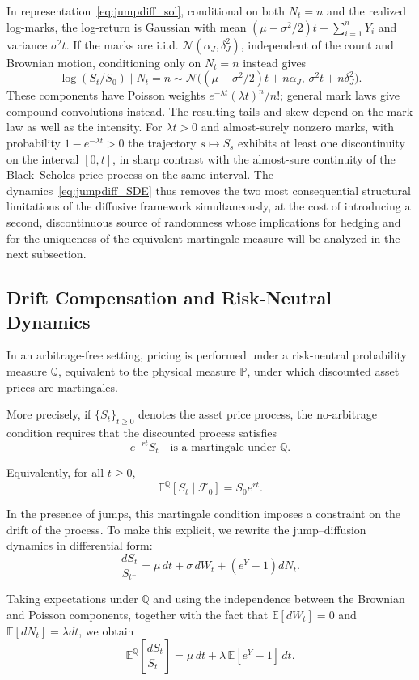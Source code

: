 In representation~\eqref{eq:jumpdiff_sol}, conditional on both
$N_t=n$ and the realized log-marks, the log-return is Gaussian with
mean $(\mu-\sigma^2/2)t+\sum_{i=1}^nY_i$ and variance $\sigma^2t$.
If the marks are i.i.d. $\mathcal N(\alpha_J,\delta_J^2)$, independent of the
count and Brownian motion, conditioning only on $N_t=n$ instead gives
\[
\log(S_t/S_0)\mid N_t=n\sim
\mathcal N\bigl((\mu-\sigma^2/2)t+n\alpha_J,\,\sigma^2t+n\delta_J^2\bigr).
\]
These components have Poisson weights $e^{-\lambda t}(\lambda t)^n/n!$;
general mark laws give compound convolutions instead. The resulting
tails and skew depend on the mark law as well as the intensity.
For $\lambda t>0$ and almost-surely nonzero marks, with probability
$1 - e^{-\lambda t} > 0$ the trajectory $s \mapsto S_s$ exhibits at
least one discontinuity on the interval $[0,t]$, in sharp contrast
with the almost-sure continuity of the Black--Scholes price process
on the same interval. The dynamics~\eqref{eq:jumpdiff_SDE} thus
removes the two most consequential structural limitations of the
diffusive framework simultaneously, at the cost of introducing a
second, discontinuous source of randomness whose implications for
hedging and for the uniqueness of the equivalent martingale measure
will be analyzed in the next subsection.
\subsection{Drift Compensation and Risk-Neutral Dynamics}
\label{sec:jd-risk-neutral}

In an arbitrage-free setting, pricing is performed under a risk-neutral probability measure $\mathbb{Q}$, equivalent to the physical measure $\mathbb{P}$, under which discounted asset prices are martingales.

More precisely, if $\{S_t\}_{t \geq 0}$ denotes the asset price process, the no-arbitrage condition requires that the discounted process satisfies
\[
e^{-rt} S_t \quad \text{is a martingale under } \mathbb{Q}.
\]

Equivalently, for all $t \geq 0$,
\[
\mathbb{E}^{\mathbb{Q}}[S_t \mid \mathcal{F}_0] = S_0 e^{rt}.
\]

In the presence of jumps, this martingale condition imposes a constraint on the drift of the process. To make this explicit, we rewrite the jump--diffusion dynamics in differential form:
\[
\frac{dS_t}{S_{t^-}} = \mu \, dt + \sigma \, dW_t + (e^{Y} - 1) dN_t.
\]

Taking expectations under $\mathbb{Q}$ and using the independence between the Brownian and Poisson components, together with the fact that $\mathbb{E}[dW_t] = 0$ and $\mathbb{E}[dN_t] = \lambda dt$, we obtain
\[
\mathbb{E}^{\mathbb{Q}}\left[\frac{dS_t}{S_{t^-}}\right] = \mu \, dt + \lambda \, \mathbb{E}[e^{Y} - 1] \, dt.
\]

